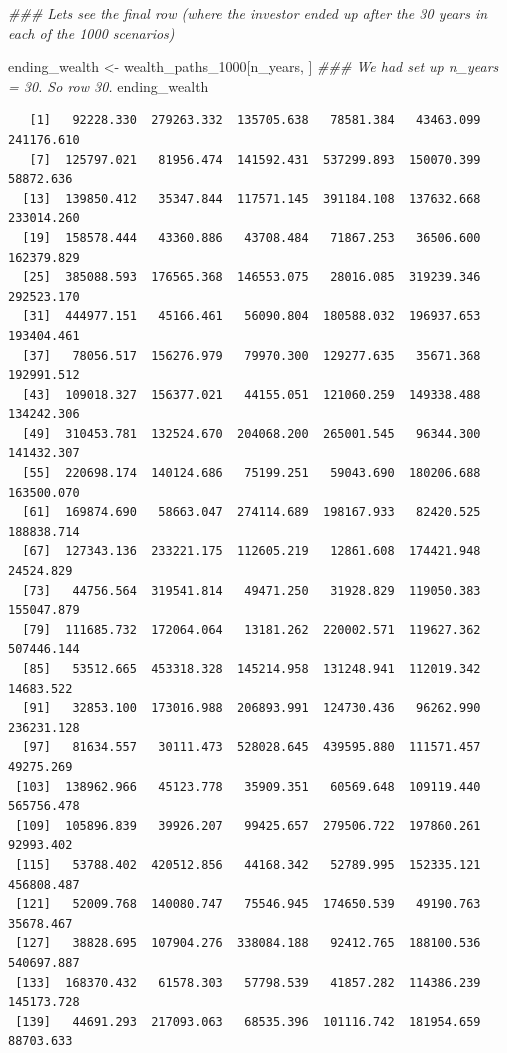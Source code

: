 \documentclass[
  letterpaper,
  DIV=11,
  numbers=noendperiod]{scrartcl}
\newenvironment{Shaded}{\begin{snugshade}}{\end{snugshade}}
\newcommand{\DocumentationTok}[1]{\textcolor[rgb]{0.37,0.37,0.37}{\textit{#1}}}
\newcommand{\NormalTok}[1]{\textcolor[rgb]{0.00,0.23,0.31}{#1}}
\newcommand{\OtherTok}[1]{\textcolor[rgb]{0.00,0.23,0.31}{#1}}
\begin{document}
\begin{Shaded}
\begin{Highlighting}[]
\DocumentationTok{\#\#\# Let\textquotesingle{}s see the final row (where the investor ended up after the 30 years in each of the 1000 scenarios)}

\NormalTok{ending\_wealth }\OtherTok{\textless{}{-}}\NormalTok{ wealth\_paths\_1000[n\_years, ]  }\DocumentationTok{\#\#\# We had set up n\_years = 30. So row 30.}
\NormalTok{ending\_wealth}
\end{Highlighting}
\end{Shaded}

\begin{verbatim}
   [1]   92228.330  279263.332  135705.638   78581.384   43463.099  241176.610
   [7]  125797.021   81956.474  141592.431  537299.893  150070.399   58872.636
  [13]  139850.412   35347.844  117571.145  391184.108  137632.668  233014.260
  [19]  158578.444   43360.886   43708.484   71867.253   36506.600  162379.829
  [25]  385088.593  176565.368  146553.075   28016.085  319239.346  292523.170
  [31]  444977.151   45166.461   56090.804  180588.032  196937.653  193404.461
  [37]   78056.517  156276.979   79970.300  129277.635   35671.368  192991.512
  [43]  109018.327  156377.021   44155.051  121060.259  149338.488  134242.306
  [49]  310453.781  132524.670  204068.200  265001.545   96344.300  141432.307
  [55]  220698.174  140124.686   75199.251   59043.690  180206.688  163500.070
  [61]  169874.690   58663.047  274114.689  198167.933   82420.525  188838.714
  [67]  127343.136  233221.175  112605.219   12861.608  174421.948   24524.829
  [73]   44756.564  319541.814   49471.250   31928.829  119050.383  155047.879
  [79]  111685.732  172064.064   13181.262  220002.571  119627.362  507446.144
  [85]   53512.665  453318.328  145214.958  131248.941  112019.342   14683.522
  [91]   32853.100  173016.988  206893.991  124730.436   96262.990  236231.128
  [97]   81634.557   30111.473  528028.645  439595.880  111571.457   49275.269
 [103]  138962.966   45123.778   35909.351   60569.648  109119.440  565756.478
 [109]  105896.839   39926.207   99425.657  279506.722  197860.261   92993.402
 [115]   53788.402  420512.856   44168.342   52789.995  152335.121  456808.487
 [121]   52009.768  140080.747   75546.945  174650.539   49190.763   35678.467
 [127]   38828.695  107904.276  338084.188   92412.765  188100.536  540697.887
 [133]  168370.432   61578.303   57798.539   41857.282  114386.239  145173.728
 [139]   44691.293  217093.063   68535.396  101116.742  181954.659   88703.633

\end{verbatim}
\end{document}
